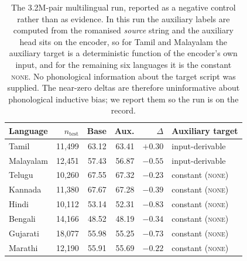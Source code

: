\begin{table}[t]
\centering
\small
\begin{tabular}{lrrrrl}
\toprule
\textbf{Language} & $n_{\text{test}}$ & \textbf{Base} & \textbf{Aux.} & $\Delta$ & \textbf{Auxiliary target} \\
\midrule
Tamil & 11,499 & 63.12 & 63.41 & $+0.30$ & input-derivable \\
Malayalam & 12,451 & 57.43 & 56.87 & $-0.55$ & input-derivable \\
Telugu & 10,260 & 67.55 & 67.32 & $-0.23$ & constant (\textsc{none}) \\
Kannada & 11,380 & 67.67 & 67.28 & $-0.39$ & constant (\textsc{none}) \\
Hindi & 10,112 & 53.14 & 52.31 & $-0.83$ & constant (\textsc{none}) \\
Bengali & 14,166 & 48.52 & 48.19 & $-0.34$ & constant (\textsc{none}) \\
Gujarati & 18,077 & 55.98 & 55.25 & $-0.73$ & constant (\textsc{none}) \\
Marathi & 12,190 & 55.91 & 55.69 & $-0.22$ & constant (\textsc{none}) \\
\bottomrule
\end{tabular}
\caption{The 3.2M-pair multilingual run, reported as a negative control rather than as evidence. In this run the auxiliary labels are computed from the romanised \emph{source} string and the auxiliary head sits on the encoder, so for Tamil and Malayalam the auxiliary target is a deterministic function of the encoder's own input, and for the remaining six languages it is the constant \textsc{none}. No phonological information about the target script was supplied. The near-zero deltas are therefore uninformative about phonological inductive bias; we report them so the run is on the record.}
\label{tab:control}
\end{table}